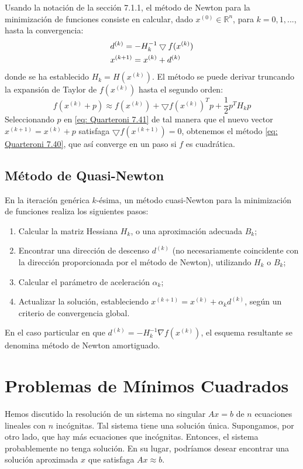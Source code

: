 Usando la notación de la sección 7.1.1, el método de Newton para la minimización de funciones consiste en calcular, dado $x^{(0)} \in \mathbb{R}^n$, para $k = 0, 1, ...$, hasta la convergencia:
\begin{align}
    \label{eq: Quarteroni 7.40}
    & d^{(k)} = - H_k^{-1} \bigtriangledown f(x^{(k)}) \notag \\
    & x^{(k + 1)} = x^{(k)} + d^{(k)}
\end{align}
donde se ha establecido $H_k = H(x^{(k)})$. El método se puede derivar truncando la expansión de Taylor de $f(x^{(k)})$ hasta el segundo orden:
\begin{equation}
    \label{eq: Quarteroni 7.41}
    f(x^{(k)} + p) \approx f(x^{(k)}) + \bigtriangledown f(x^{(k)})^T p + \frac{1}{2} p^T H_k p
\end{equation}
Seleccionando $p$ en \ref{eq: Quarteroni 7.41} de tal manera que el nuevo vector $x^{(k + 1)} = x^{(k)} + p$ satisfaga $\bigtriangledown f(x^{(k+1)}) = 0$, obtenemos el método \ref{eq: Quarteroni 7.40}, que así converge en un paso si $f$ es cuadrática.

\subsection{Método de Quasi-Newton}
En la iteración genérica \( k \)-ésima, un método cuasi-Newton para la minimización de funciones realiza los siguientes pasos:

\begin{enumerate}
    \item Calcular la matriz Hessiana \( H_k \), o una aproximación adecuada \( B_k \);
    \item Encontrar una dirección de descenso \( d^{(k)} \) (no necesariamente coincidente con la dirección proporcionada por el método de Newton), utilizando \( H_k \) o \( B_k \);
    \item Calcular el parámetro de aceleración \( \alpha_k \);
    \item Actualizar la solución, estableciendo \( x^{(k+1)} = x^{(k)} + \alpha_k d^{(k)} \), según un criterio de convergencia global.
\end{enumerate}

En el caso particular en que \( d^{(k)} = -H_k^{-1} \nabla f(x^{(k)}) \), el esquema resultante se denomina método de Newton amortiguado.

\section{Problemas de Mínimos Cuadrados}
Hemos discutido la resolución de un sistema no singular $Ax = b$ de $n$ ecuaciones lineales con $n$ incógnitas. Tal sistema tiene una solución única. Supongamos, por otro lado, que hay más ecuaciones que incógnitas. Entonces, el sistema probablemente no tenga solución. En su lugar, podríamos desear encontrar una solución aproximada $x$ que satisfaga $Ax \approx b$.

